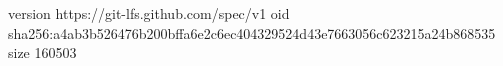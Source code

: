 version https://git-lfs.github.com/spec/v1
oid sha256:a4ab3b526476b200bffa6e2c6ec404329524d43e7663056c623215a24b868535
size 160503
